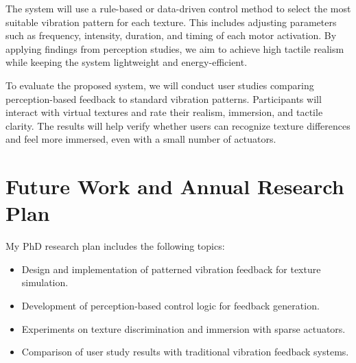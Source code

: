 \documentclass[graybox]{svmult}
\begin{document}
The system will use a rule-based or data-driven control method to select the most suitable vibration pattern for each texture. This includes adjusting parameters such as frequency, intensity, duration, and timing of each motor activation. By applying findings from perception studies, we aim to achieve high tactile realism while keeping the system lightweight and energy-efficient.

To evaluate the proposed system, we will conduct user studies comparing perception-based feedback to standard vibration patterns. Participants will interact with virtual textures and rate their realism, immersion, and tactile clarity. The results will help verify whether users can recognize texture differences and feel more immersed, even with a small number of actuators.

\section{Future Work and Annual Research Plan}
\label{sec:conc}
My PhD research plan includes the following topics:
\begin{itemize}
	\item Design and implementation of patterned vibration feedback for texture simulation.
	\item Development of perception-based control logic for feedback generation.
	\item Experiments on texture discrimination and immersion with sparse actuators.
	\item Comparison of user study results with traditional vibration feedback systems.
\end{itemize}
\end{document}
